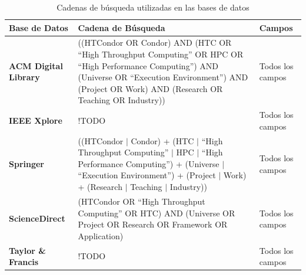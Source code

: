 \begin{table}[htbp]
	\centering
	\caption{Cadenas de búsqueda utilizadas en las bases de datos}
	\label{table:cadenas_de_busqueda}
	\renewcommand{\arraystretch}{1.5}  %
	\begin{tabular}{p{4cm}p{8.5cm}p{3.5cm}}
		\toprule
		\textbf{Base de Datos}       & \textbf{Cadena de Búsqueda}                                                                                                                                                                                         & \textbf{Campos}  \\
		\midrule
		\textbf{ACM Digital Library} & ((HTCondor OR Condor) AND (HTC OR ``High Throughput Computing'' OR HPC OR ``High Performance Computing'') AND (Universe OR ``Execution Environment'') AND (Project OR Work) AND (Research OR Teaching OR Industry)) & Todos los campos \\
		\addlinespace[0.8em]
		\textbf{IEEE Xplore}         & !TODO                                                                                                                                                                                                               & Todos los campos \\
		\addlinespace[0.8em]
		\textbf{Springer}            & ((HTCondor $|$ Condor) + (HTC $|$ ``High Throughput Computing'' $|$ HPC $|$ ``High Performance Computing'') + (Universe $|$ ``Execution Environment'') + (Project $|$ Work) + (Research $|$ Teaching $|$ Industry)) & Todos los campos \\
		\addlinespace[0.8em]
		\textbf{ScienceDirect}       & (HTCondor OR ``High Throughput Computing'' OR HTC) AND (Universe OR Project OR Research OR Framework OR Application)                                                                                                & Todos los campos \\
		\addlinespace[0.8em]
		\textbf{Taylor \& Francis}   & !TODO                                                                                                                                                                                                               & Todos los campos \\
		\bottomrule
	\end{tabular}
\end{table}





